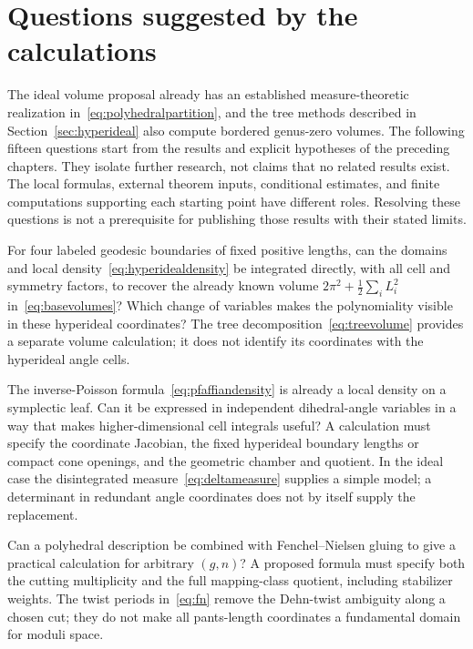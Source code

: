 \section{Questions suggested by the calculations}
\label{sec:questions}

The ideal volume proposal already has an established measure-theoretic
realization in~\eqref{eq:polyhedralpartition}, and the tree methods described
in Section~\ref{sec:hyperideal} also compute bordered genus-zero volumes.
The following fifteen questions start from the results and explicit
hypotheses of the preceding chapters. They isolate further research,
not claims that no related results exist. The local formulas, external
theorem inputs, conditional estimates, and finite computations supporting
each starting point have different roles. Resolving these questions is
not a prerequisite for publishing those results with their stated limits.

\begin{question}
For four labeled geodesic boundaries of fixed positive lengths, can the
domains and local density~\eqref{eq:hyperidealdensity} be integrated
directly, with all cell and symmetry factors, to recover the already
known volume $2\pi^2+\frac12\sum_iL_i^2$ in~\eqref{eq:basevolumes}?
Which change of variables makes the polynomiality visible in these
hyperideal coordinates? The tree decomposition~\eqref{eq:treevolume}
provides a separate volume calculation; it does not identify its
coordinates with the hyperideal angle cells.
\end{question}

\begin{question}
The inverse-Poisson formula~\eqref{eq:pfaffiandensity} is already a local
density on a symplectic leaf. Can it be expressed in independent
dihedral-angle variables in a way that makes higher-dimensional cell
integrals useful? A calculation must specify the coordinate Jacobian,
the fixed hyperideal boundary lengths or compact cone openings, and the
geometric chamber and quotient. In the ideal case the disintegrated
measure~\eqref{eq:deltameasure} supplies a simple model; a determinant
in redundant angle coordinates does not by itself supply the replacement.
\end{question}

\begin{question}
Can a polyhedral description be combined with Fenchel--Nielsen gluing to
give a practical calculation for arbitrary $(g,n)$? A proposed formula
must specify both the cutting multiplicity and the full mapping-class
quotient, including stabilizer weights. The twist periods in~\eqref{eq:fn}
remove the Dehn-twist ambiguity along a chosen cut; they do not make
all pants-length coordinates a fundamental domain for moduli space.
\end{question}

